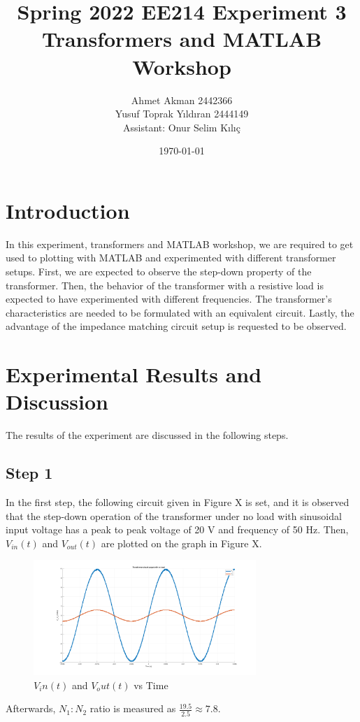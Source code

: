 \documentclass[letterpaper,12pt]{article}
\begin{document}
\thispagestyle{empty}

\title{Spring 2022 EE214 Experiment 3  \protect\\ Transformers and MATLAB Workshop }
\author{Ahmet Akman 2442366 \protect\\ Yusuf Toprak Yıldıran 2444149 \protect\\ Assistant: Onur Selim Kılıç}
\date{\today}
\maketitle
\tableofcontents
\section{Introduction}
In this experiment, transformers and MATLAB workshop, we are required to get used to plotting with MATLAB and experimented with different transformer setups. First, we are expected to observe the step-down property of the transformer. Then, the behavior of the transformer with a resistive load is expected to have experimented with different frequencies. The transformer's characteristics are needed to be formulated with an equivalent circuit. Lastly, the advantage of the impedance matching circuit setup is requested to be observed.
\section{Experimental Results and Discussion}
The results of the experiment are discussed in the following steps.
%
\subsection{Step 1}


In the first step, the following circuit given in Figure X is set, and it is observed that the step-down operation of the transformer under no load with sinusoidal input voltage has a peak to peak voltage of 20 V and frequency of 50 Hz. Then, \(V_{in}(t) \) and \(V_{out}(t)\) are plotted on the graph in Figure X.
\begin{figure}[H]
    \centering
    \includegraphics[width = 0.75\textwidth]{1_1.png}
    \caption{\(V_in(t) \) and \(V_out(t)\) vs Time}
\end{figure} 
Afterwards, \(N_1:N_2\) ratio is measured as \(\frac{19.5}{2.5}\approx 7.8 \).
\end{document}
